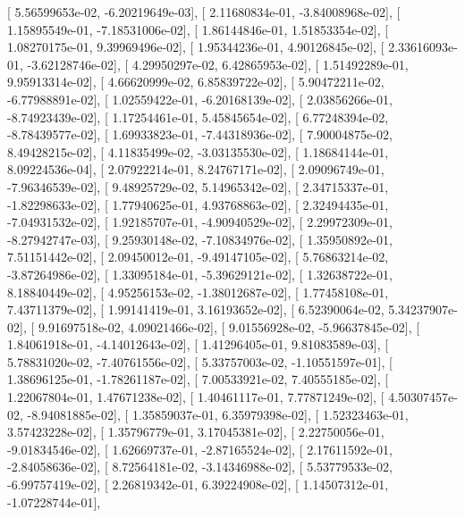 \documentclass{article}
\begin{document}
       [  5.56599653e-02,  -6.20219649e-03],
       [  2.11680834e-01,  -3.84008968e-02],
       [  1.15895549e-01,  -7.18531006e-02],
       [  1.86144846e-01,   1.51853354e-02],
       [  1.08270175e-01,   9.39969496e-02],
       [  1.95344236e-01,   4.90126845e-02],
       [  2.33616093e-01,  -3.62128746e-02],
       [  4.29950297e-02,   6.42865953e-02],
       [  1.51492289e-01,   9.95913314e-02],
       [  4.66620999e-02,   6.85839722e-02],
       [  5.90472211e-02,  -6.77988891e-02],
       [  1.02559422e-01,  -6.20168139e-02],
       [  2.03856266e-01,  -8.74923439e-02],
       [  1.17254461e-01,   5.45845654e-02],
       [  6.77248394e-02,  -8.78439577e-02],
       [  1.69933823e-01,  -7.44318936e-02],
       [  7.90004875e-02,   8.49428215e-02],
       [  4.11835499e-02,  -3.03135530e-02],
       [  1.18684144e-01,   8.09224536e-04],
       [  2.07922214e-01,   8.24767171e-02],
       [  2.09096749e-01,  -7.96346539e-02],
       [  9.48925729e-02,   5.14965342e-02],
       [  2.34715337e-01,  -1.82298633e-02],
       [  1.77940625e-01,   4.93768863e-02],
       [  2.32494435e-01,  -7.04931532e-02],
       [  1.92185707e-01,  -4.90940529e-02],
       [  2.29972309e-01,  -8.27942747e-03],
       [  9.25930148e-02,  -7.10834976e-02],
       [  1.35950892e-01,   7.51151442e-02],
       [  2.09450012e-01,  -9.49147105e-02],
       [  5.76863214e-02,  -3.87264986e-02],
       [  1.33095184e-01,  -5.39629121e-02],
       [  1.32638722e-01,   8.18840449e-02],
       [  4.95256153e-02,  -1.38012687e-02],
       [  1.77458108e-01,   7.43711379e-02],
       [  1.99141419e-01,   3.16193652e-02],
       [  6.52390064e-02,   5.34237907e-02],
       [  9.91697518e-02,   4.09021466e-02],
       [  9.01556928e-02,  -5.96637845e-02],
       [  1.84061918e-01,  -4.14012643e-02],
       [  1.41296405e-01,   9.81083589e-03],
       [  5.78831020e-02,  -7.40761556e-02],
       [  5.33757003e-02,  -1.10551597e-01],
       [  1.38696125e-01,  -1.78261187e-02],
       [  7.00533921e-02,   7.40555185e-02],
       [  1.22067804e-01,   1.47671238e-02],
       [  1.40461117e-01,   7.77871249e-02],
       [  4.50307457e-02,  -8.94081885e-02],
       [  1.35859037e-01,   6.35979398e-02],
       [  1.52323463e-01,   3.57423228e-02],
       [  1.35796779e-01,   3.17045381e-02],
       [  2.22750056e-01,  -9.01834546e-02],
       [  1.62669737e-01,  -2.87165524e-02],
       [  2.17611592e-01,  -2.84058636e-02],
       [  8.72564181e-02,  -3.14346988e-02],
       [  5.53779533e-02,  -6.99757419e-02],
       [  2.26819342e-01,   6.39224908e-02],
       [  1.14507312e-01,  -1.07228744e-01],
\end{document}
